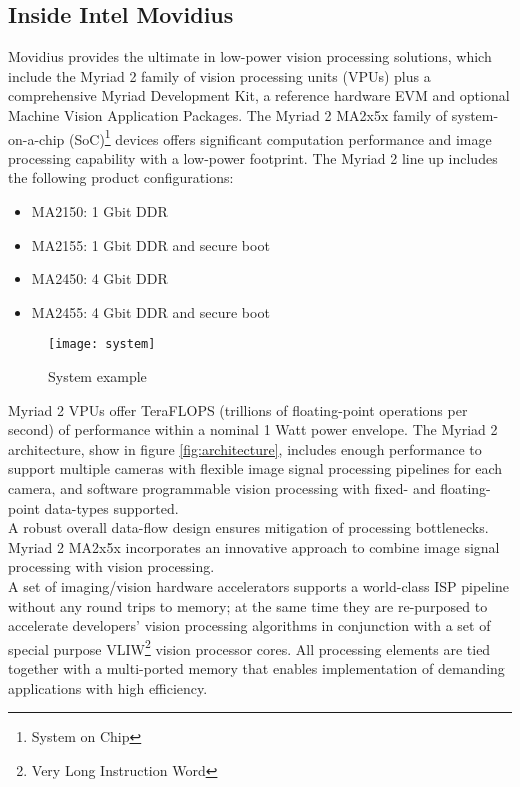 \subsection{Inside Intel Movidius}
\label{subsec:techspec}
Movidius provides the ultimate in low-power vision processing solutions, which 
include the Myriad 2 family of vision processing units (VPUs) plus a 
comprehensive Myriad Development Kit, a reference hardware EVM and 
optional Machine Vision Application Packages.
The Myriad 2 MA2x5x family of system-on-a-chip (SoC)\footnote{System on Chip} 
devices offers significant computation performance and image processing 
capability with a low-power footprint.
The Myriad 2 line up includes the following product configurations:
\begin{itemize}
	\item	MA2150: 1 Gbit DDR
	\item	MA2155: 1 Gbit DDR and secure boot 
	\item	MA2450: 4 Gbit DDR
	\item	MA2455: 4 Gbit DDR and secure boot
\end{itemize}
%
\begin{figure}[!h]
\centering
\texttt{[image: system]}
\caption{System example}
\label{fig:systemexample}
\end{figure}
% 
Myriad 2 VPUs offer TeraFLOPS (trillions of floating-point operations per 
second) of performance within a nominal 1 Watt power envelope. 
The Myriad 2 architecture, show in figure \ref{fig:architecture}, includes enough 
performance to support multiple cameras with flexible image signal processing 
pipelines for each camera, and software programmable vision processing with 
fixed- and floating-point data-types supported.\\ 
A robust overall data-flow design ensures mitigation of processing bottlenecks.
Myriad 2 MA2x5x incorporates an innovative approach to combine image signal 
processing with vision processing.\\ 
A set of imaging/vision hardware accelerators supports a world-class ISP pipeline 
without any round trips to memory; at the same time they are re-purposed to 
accelerate developers' vision processing algorithms in conjunction with a set of 
special purpose VLIW\footnote{Very Long Instruction Word} vision processor cores. 
All processing elements are tied together with a multi-ported memory that enables 
implementation of demanding applications with high efficiency.\cite{intel}\\
